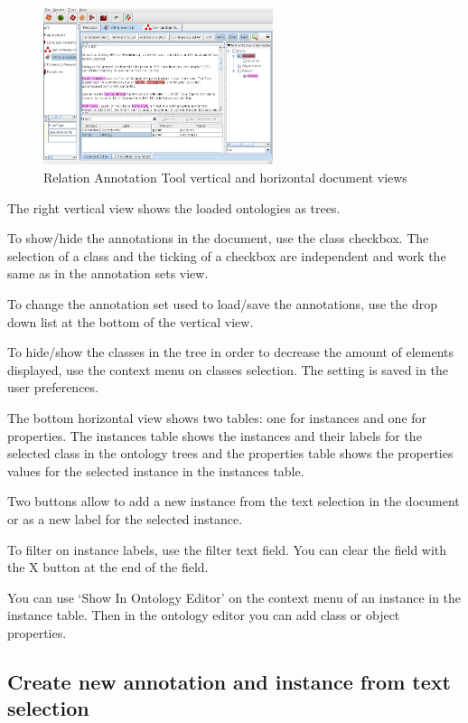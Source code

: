{\begin{figure}[!htbp]
\begin{center}
\includegraphics[width=0.6\textwidth]{relation-annotation-tool.png}
\caption{Relation Annotation Tool vertical and horizontal document views}
\label{fig:relation-annotation-tool-views}
\end{center}
\end{figure}

The right vertical view shows the loaded ontologies as trees.

To show/hide the annotations in the document, use the class checkbox. The
selection of a class and the ticking of a checkbox are independent and work
the same as in the annotation sets view.

To change the annotation set used to load/save the annotations, use the drop
down list at the bottom of the vertical view.

To hide/show the classes in the tree in order to decrease the amount of
elements displayed, use the context menu on classes selection. The setting
is saved in the user preferences.

The bottom horizontal view shows two tables: one for instances and one for
properties. The instances table shows the instances and their labels for the
selected class in the ontology trees and the properties table shows the
properties values for the selected instance in the instances table.

Two buttons allow to add a new instance from the text selection in the
document or as a new label for the selected instance.

To filter on instance labels, use the filter text field. You can clear the
field with the X button at the end of the field.

You can use `Show In Ontology Editor' on the context menu of an instance in
the instance table. Then in the ontology editor you can add class or object
properties.

\subsection{Create new annotation and instance from text selection}

}
